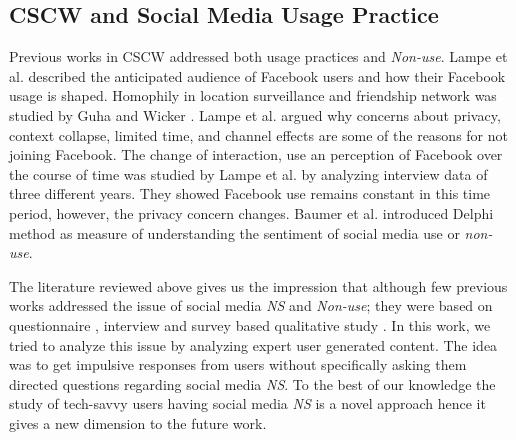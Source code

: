 \subsection{CSCW and Social Media Usage Practice}

Previous works in CSCW addressed both usage practices \cite{grudin1988cscw} and \emph{Non-use}. Lampe et al. \cite{lampe2006face} described the anticipated audience of Facebook users and how their Facebook usage is shaped. Homophily in location surveillance and friendship network was studied by Guha and Wicker \cite{guha2015birds}. Lampe et al. \cite{lampe2013users} argued why concerns about privacy, context collapse, limited time, and channel effects are some of the reasons for not joining Facebook. The change of interaction, use an perception of Facebook over the course of time was studied by Lampe et al. \cite{lampe2008changes} by analyzing interview data of three different years. They showed Facebook use remains constant in this time period, however, the privacy concern changes. Baumer et al. \cite{baumer2017subjects} introduced Delphi method as measure of understanding the sentiment of social media use or \emph{non-use}.




The literature reviewed above gives us the impression that although few previous works addressed the issue of social media \emph{NS} and \textit{Non-use}; they were based on questionnaire \cite{hampton2015social, baker2011their}, interview\cite{turan2013reasons} and survey \cite{baumer2015missing, brody2018opting} based qualitative study \cite{baumer2013limiting, nonnecke2001lurkers}. In this work, we tried to analyze this issue by analyzing expert user generated content. The idea was to get impulsive responses from users without specifically asking them directed questions regarding social media \emph{NS}. To the best of our knowledge the study of tech-savvy users having social media \emph{NS} is a novel approach hence it gives a new dimension to the future work. 